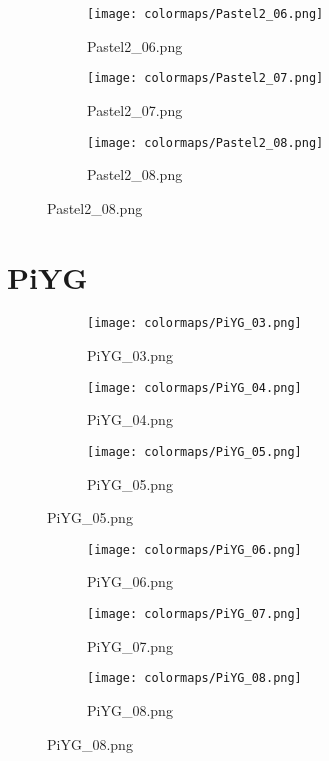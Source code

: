 \documentclass{article}%
\begin{document}
%
\hspace{1cm}\hfill%
\hspace{1cm}\hfill%
\hspace{1cm}\hfill%


\begin{figure}[h!]%
\begin{subfigure}[b]{0.3\linewidth}%
\texttt{[image: colormaps/Pastel2\_06.png]}%
\caption{Pastel2\_06.png}%
\end{subfigure}%
\begin{subfigure}[b]{0.3\linewidth}%
\texttt{[image: colormaps/Pastel2\_07.png]}%
\caption{Pastel2\_07.png}%
\end{subfigure}%
\begin{subfigure}[b]{0.3\linewidth}%
\texttt{[image: colormaps/Pastel2\_08.png]}%
\caption{Pastel2\_08.png}%
\end{subfigure}%
\end{figure}

%
\newpage%
\section{PiYG}%
\label{sec:PiYG}%
\hspace{1cm}\hfill%
\hspace{1cm}\hfill%
\hspace{1cm}\hfill%


\begin{figure}[h!]%
\begin{subfigure}[b]{0.3\linewidth}%
\texttt{[image: colormaps/PiYG\_03.png]}%
\caption{PiYG\_03.png}%
\end{subfigure}%
\begin{subfigure}[b]{0.3\linewidth}%
\texttt{[image: colormaps/PiYG\_04.png]}%
\caption{PiYG\_04.png}%
\end{subfigure}%
\begin{subfigure}[b]{0.3\linewidth}%
\texttt{[image: colormaps/PiYG\_05.png]}%
\caption{PiYG\_05.png}%
\end{subfigure}%
\end{figure}

%
\hspace{1cm}\hfill%
\hspace{1cm}\hfill%
\hspace{1cm}\hfill%


\begin{figure}[h!]%
\begin{subfigure}[b]{0.3\linewidth}%
\texttt{[image: colormaps/PiYG\_06.png]}%
\caption{PiYG\_06.png}%
\end{subfigure}%
\begin{subfigure}[b]{0.3\linewidth}%
\texttt{[image: colormaps/PiYG\_07.png]}%
\caption{PiYG\_07.png}%
\end{subfigure}%
\begin{subfigure}[b]{0.3\linewidth}%
\texttt{[image: colormaps/PiYG\_08.png]}%
\caption{PiYG\_08.png}%
\end{subfigure}%
\end{figure}
\end{document}
